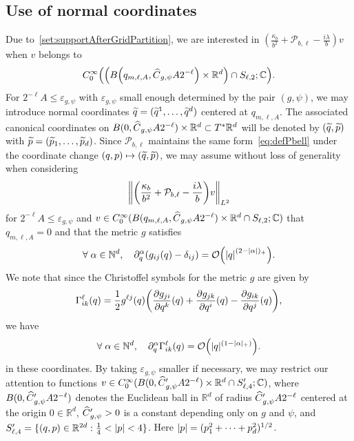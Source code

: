 \documentclass[AHL,Unicode,longabstracts]{cedram}
\newcommand{\C}{\mathbb{C}}
\newcommand{\R}{\mathbb{R}}
\newcommand{\N}{\mathbb{N}}
\newcommand{\clO}{\mathcal{O}}
\newcommand{\clP}{\mathcal{P}}
\newcommand{\p}{\partial}
\newcommand{\abs}[1]{\left| #1 \right|}
\newcommand\norm[1]{\left\lVert#1\right\rVert}
\let\oldtilde\tilde
\renewcommand*{\tilde}[1]{\mathchoice{\widetilde{#1}}{\widetilde{#1}}{\oldtilde{#1}}{\oldtilde{#1}}}
\let\oldhat\hat
\renewcommand*{\hat}[1]{\mathchoice{\widehat{#1}}{\widehat{#1}}{\oldhat{#1}}{\oldhat{#1}}}
\let\oldforall\forall
\renewcommand*{\forall}{\mathrel{\oldforall}}
\let\originalleft\left
\let\originalright\right
\renewcommand{\left}{\mathopen{}\mathclose\bgroup\originalleft}
\renewcommand{\right}{\aftergroup\egroup\originalright}
\let\oldmapsto\mapsto
\renewcommand*{\mapsto}{\mathchoice{\longmapsto}{\oldmapsto}{\oldmapsto}{\oldmapsto}}
\begin{document}
\subsection{Use of normal coordinates}\label{subsec:NormalCoordinate}
Due to~\eqref{set:supportAfterGridPartition}, we are interested in $(\frac{\kappa_b}{b^2}+\clP_{b, \ell} - \frac{i \lambda}{b}) v$ when $v$ belongs to
\[
C^\infty_0\left(\left(B\left(q_{m,\ell,A}, \hat{C}_{g,\psi}A2^{-\ell}\right)\times \R^d\right)\cap S_{\ell,2};\mathbb{C}\right).
\]
For $2^{-\ell}A\leq \varepsilon_{g,\psi}$ with $\varepsilon_{g,\psi}$ small enough determined by the pair $(g,\psi)$, we may introduce normal coordinates $\tilde{q} = (\tilde{q}^1, \dots, \tilde{q}^d)$ centered at $q_{m, \ell, A}$. The associated canonical coordinates on $B(0, \hat{C}_{g, \psi} A 2^{-\ell}) \times \R^d \subset T^* \R^d$ will be denoted by $(\tilde{q}, \tilde{p})$ with $\tilde{p} = (\tilde{p}_1, \dots, \tilde{p}_d)$. Since $\clP_{b, \ell}$ maintains the same form~\eqref{eq:defPbell} under the coordinate change $(q,p) \mapsto (\tilde{q}, \tilde{p})$, we may assume without loss of generality when considering
\begin{align}\label{quantity_to_bound_below}
\norm{\left(\frac{\kappa_b}{b^2}+\clP_{b,\ell}-\frac{i \lambda}{b}\right) v}_{L^2}
\end{align}
for $2^{-\ell}A \leq \varepsilon_{g, \psi}$ and $v \in C^\infty_0(B(q_{m,\ell,A}, \hat{C}_{g,\psi}A2^{-\ell})\times \R^d \cap S_{\ell,2}; \C)$ that $q_{m, \ell, A} = 0$ and that the metric $g$ satisfies
\begin{equation}\label{eq:BoundForTheMetricInNormalCoordinate}
\forall \alpha \in \N^d, \quad \p^\alpha_q \left(g_{ij}(q)-\delta_{ij}\right) = \clO\left(\abs{q}^{(2-\abs{\alpha})_{+}}\right).
\end{equation}
We note that since the Christoffel symbols for the metric $g$ are given by
\begin{equation}
\Gamma_{ik}^{\ell}(q) = \frac{1}{2}g^{\ell j}(q)\left(\frac{\partial g_{j i}}{\partial q^{k}}(q) + \frac{\partial g_{jk}}{\partial q^{i}}(q) - \frac{\partial g_{ik}}{\partial q^{j}}(q)\right),
\end{equation}
we have
\begin{equation}\label{eq:BoundForTheChristoffelSymbolInNormalCoordinate}
\forall \alpha \in \N^d, \quad \partial_q^{\alpha}\Gamma_{ik}^{\ell}(q) = {\clO}\left(|q|^{(1-|\alpha|_+)}\right).
\end{equation}
in these coordinates. By taking $\varepsilon_{g, \psi}$ smaller if necessary, we may restrict our attention to functions $v \in C^\infty_0(B(0, \hat{C}'_{g, \psi} A 2^{-\ell}) \times \R^d \cap S'_{\ell,4}; \C)$, where $B(0, \hat{C}'_{g, \psi} A 2^{-\ell})$ denotes the Euclidean ball in $\R^d$ of radius $\hat{C}'_{g, \psi} A 2^{-\ell}$ centered at the origin $0 \in \R^d$, $\hat{C}'_{g, \psi}>0$ is a constant depending only on $g$ and $\psi$, and $S'_{\ell,4} = \{(q,p) \in \R^{2d}:\frac{1}{4}<\abs{p}<4\}$. Here $\abs{p} = (p_1^2+\dots+p_d^2)^{1/2}$.
\end{document}
